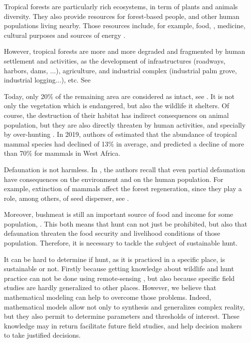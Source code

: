\documentclass{article}
\begin{document}
Tropical forests are particularly rich ecosystems, in term of plants and animals diversity. They also provide resources for forest-based people, and other human populations living nearby. Those resources include, for example, food, \cite{avila_martin_food_2024}, medicine, cultural purposes \cite{kumar_marginal_2014} and sources of energy \cite{mangula_energy_2019}.

However, tropical forests are more and more degraded and fragmented by human settlement and activities, as the development of infrastructures (roadways, harbors, dams, ...), agriculture, and industrial complex (industrial palm grove, industrial logging...), etc. See 

Today, only 20\% of the remaining area are considered as intact, see \cite{benitez-lopez_intact_2019}. It is not only the vegetation which is endangered, but also the wildlife it shelters. Of course, the destruction of their habitat has indirect consequences on animal population, but they are also directly threaten by human activities, and specially by over-hunting \cite{wilkie_empty_2011, benitez-lopez_intact_2019}. In 2019, authors of \cite{benitez-lopez_intact_2019} estimated that the abundance of tropical mammal species had declined of 13\% in average, and predicted a decline of more than 70\% for mammals in West Africa. 

Defaunation is not harmless. In \cite{ripple_bushmeat_2016}, the authors recall that even partial defaunation have consequences on the environment and on the human population. For example, extinction of mammals affect the forest regeneration, since they play a role, among others, of seed disperser, see \cite{wright_bushmeat_2007, peres_dispersal_2016}.

Moreover, bushmeat is still an important source of food and income for some population, \cite{jones_incentives_2019}. This both means that hunt can not just be prohibited, but also that defaunation threaten the food security and livelihood conditions of those population. Therefore, it is necessary to tackle the subject of sustainable hunt.

It can be hard to determine if hunt, as it is practiced in a specific place, is sustainable or not. Firstly because getting knowledge about wildlife and hunt practice can not be done using remote-sensing \cite{peres_detecting_2006}, but also because specific field studies are hardly generalized to other places. However, we believe that mathematical modeling can help to overcome those problems. Indeed, mathematical models allow not only to synthesis and generalizes complex reality, but they also permit to determine parameters and thresholds of interest. These knowledge may in return facilitate future field studies, and help decision makers to take justified decisions.
\end{document}
